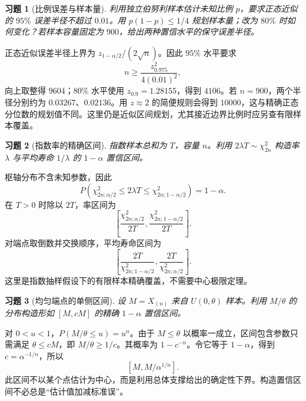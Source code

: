 \documentclass[12pt,fontset=fandol]{ctexart}
\newtheorem{exercise}{习题}[section]
\begin{document}
\begin{exercise}[比例误差与样本量]\label{q:M-C22-3}
利用独立伯努利样本估计未知比例 $p$，要求正态近似的 $95\%$ 误差半径不超过 $0.01$。用 $p(1-p)\le1/4$ 规划样本量；改为 $80\%$ 时如何变化？若样本容量固定为 $900$，给出两种置信水平的保守误差半径。\par{}
\end{exercise}

\begin{solve}\label{a:M-C22-3}正态近似误差半径上界为 $z_{1-\alpha/2}/(2\sqrt n)$。因此 $95\%$ 水平要求\[n\ge\frac{z_{0.975}^2}{4(0.01)^2},\]向上取整得 $9604$；$80\%$ 水平使用 $z_{0.9}=1.28155$，得到 $4106$。若 $n=900$，两个半径分别约为 $0.03267$、$0.02136$。用 $z\approx2$ 的简便规则会得到 $10000$，这与精确正态分位数的规划值不同。这里仍是近似区间规划，尤其接近边界比例时应另查有限样本覆盖。\end{solve}

\begin{exercise}[指数率的精确区间]\label{q:B13.1}
指数样本总和为 $T$，容量 $n$。利用 $2\lambda T\sim\chi^2_{2n}$ 构造率 $\lambda$ 与平均寿命 $1/\lambda$ 的 $1-\alpha$ 置信区间。\par{}
\end{exercise}

\begin{solve}\label{a:B13.1}枢轴分布不含未知参数，因此\[P\left(\chi^2_{2n;\alpha/2}\le2\lambda T\le\chi^2_{2n;1-\alpha/2}\right)=1-\alpha.\]在 $T>0$ 时除以 $2T$，率区间为\[\left[\frac{\chi^2_{2n;\alpha/2}}{2T},\frac{\chi^2_{2n;1-\alpha/2}}{2T}\right].\]对端点取倒数并交换顺序，平均寿命区间为\[\left[\frac{2T}{\chi^2_{2n;1-\alpha/2}},\frac{2T}{\chi^2_{2n;\alpha/2}}\right].\]这里是指数抽样假设下的有限样本精确覆盖，不需要中心极限定理。\end{solve}

\begin{exercise}[均匀端点的单侧区间]\label{q:B13.2}
设 $M=X_{(n)}$ 来自 $U(0,\theta)$ 样本。利用 $M/\theta$ 的分布构造形如 $[M,cM]$ 的精确 $1-\alpha$ 置信区间。\par{}
\end{exercise}

\begin{solve}\label{a:B13.2}对 $0<u<1$，$P(M/\theta\le u)=u^n$。由于 $M\le\theta$ 以概率一成立，区间包含参数只需满足 $\theta\le cM$，即 $M/\theta\ge1/c$。其概率为 $1-c^{-n}$。令它等于 $1-\alpha$，得到 $c=\alpha^{-1/n}$，所以\[[M,M/\alpha^{1/n}].\]此区间不以某个点估计为中心，而是利用总体支撑给出的确定性下界。构造置信区间不必总是“估计值加减标准误”。\end{solve}
\end{document}
